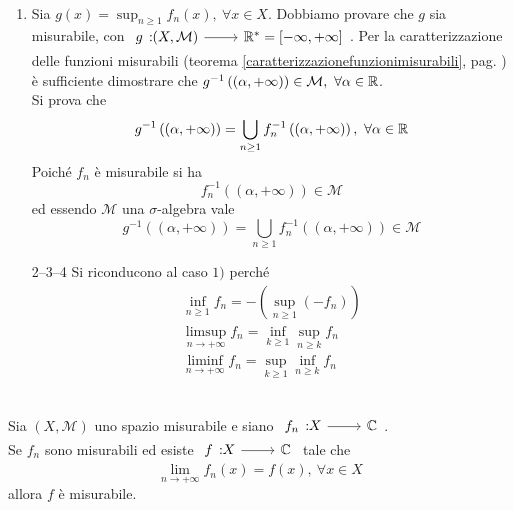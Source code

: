 \begin{demonstration}~{}
	\begin{enumerate}
		\item Sia $g\left(x\right)=\sup_{n\geq 1} f_n\left(x\right),\ \forall x\in X$. Dobbiamo provare che $g$ sia misurabile, con $\funz{g}{\left(X,\mathcal{M}\right)}{\realset^{\ast}=\left[-\infty,+\infty\right]}$. Per la caratterizzazione delle funzioni misurabili (teorema \ref{caratterizzazionefunzionimisurabili}, pag. \pageref{caratterizzazionefunzionimisurabili}) è sufficiente dimostrare che $g^{-1}\left(\left(\alpha,+\infty\right)\right)\in\mathcal{M},\ \forall\alpha\in\realset$.\\
		Si prova che
		\begin{equation*}
			g^{-1}\left(\left(\alpha,+\infty\right)\right)=\bigcup_{n\geq 1}f_n^{-1}\left(\left(\alpha,+\infty\right)\right),\ \forall \alpha\in\mathbb{R}
		\end{equation*}
	Poiché $f_n$ è misurabile si ha
	\begin{equation*}
		f_n^{-1}\left(\left(\alpha,+\infty\right)\right)\in\mathcal{M}
	\end{equation*}
ed essendo $\mathcal{M}$ una $\sigma$-algebra vale
	\begin{equation*}
	g^{-1}\left(\left(\alpha,+\infty\right)\right)=\bigcup_{n\geq 1}f_n^{-1}\left(\left(\alpha,+\infty\right)\right)\in\mathcal{M}
	\end{equation*}
	\item[2--3--4] Si riconducono al caso $1)$ perché
	\begin{gather*}
		\inf_{n\geq 1}f_n=-\left(\sup_{n\geq 1}\left(-f_n\right)\right)\\
		\limsup_{n\to+\infty}f_n=\inf_{k\geq 1}\sup_{n\geq k}f_n\\
		\liminf_{n\to+\infty}f_n=\sup_{k\geq 1}\inf_{n\geq k}f_n
	\end{gather*}
	\end{enumerate}
\end{demonstration}
\begin{corollary}~{}\\
	Sia $\left(X,\mathcal{M}\right)$ uno spazio misurabile e siano $\funz{f_n}{X}{\complexset}$.\\
	Se $f_n$ sono misurabili ed esiste $\funz{f}{X}{\complexset}$ tale che
	\begin{equation*}
		\lim_{n\to+\infty}f_n\left(x\right)=f\left(x\right),\ \forall x\in X
	\end{equation*}
	allora $f$ è misurabile.
\end{corollary}
